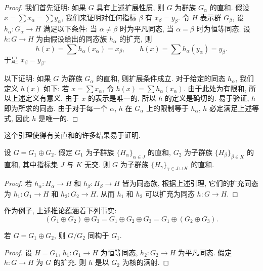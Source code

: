 \begin{proof}
我们首先证明: 如果 $G$ 具有上述扩展性质, 则 $G$ 为群族 $G_{\alpha}$ 的直和. 假设 $x=\sum x_{\alpha}=\sum y_{\alpha}$, 我们来证明对任何指标 $\beta$ 有 $x_{\beta}=y_{\beta}$. 令 $H$ 表示群 $G_{\beta}$, 设 $h_{\alpha}\colon G_{\alpha}\to H$ 满足以下条件: 当 $\alpha\neq\beta$ 时为平凡同态, 当 $\alpha=\beta$ 时为恒等同态. 设 $h\colon G\to H$ 为由假设给出的同态族 $h_{\alpha}$ 的扩充, 则
\[
h(x)=\sum h_{\alpha}(x_{\alpha})=x_{\beta},\qquad
h(x)=\sum h_{\alpha}(y_{\alpha})=y_{\beta}.
\]
于是 $x_{\beta}=y_{\beta}$.

以下证明: 如果 $G$ 为群族 $G_{\alpha}$ 的直和, 则扩展条件成立. 对于给定的同态 $h_{\alpha}$, 我们定义 $h(x)$ 如下: 若 $x=\sum x_{\alpha}$, 令 $h(x)=\sum h_{\alpha}(x_{\alpha})$. 由于此处为有限和, 所以上述定义有意义. 由于 $x$ 的表示是唯一的, 所以 $h$ 的定义是确切的. 易于验证, $h$ 即为所求的同态. 由于对于每一个 $\alpha$, $h$ 在 $G_{\alpha}$ 上的限制等于 $h_{\alpha}$, $h$ 必定满足上述等式, 因此 $h$ 是唯一的.
\end{proof}

这个引理使得有关直和的许多结果易于证明.

\begin{corollary}\label{ch11:cor-associativity}
设 $G=G_{1}\oplus G_{2}$. 假定 $G_{1}$ 为子群族 $\{H_{\alpha}\}_{\alpha\in J}$ 的直和, $G_{2}$ 为子群族 $\{H_{\beta}\}_{\beta\in K}$ 的直和, 其中指标集 $J$ 与 $K$ 无交. 则 $G$ 为子群族 $\{H_{\gamma}\}_{\gamma\in J\cup K}$ 的直和.
\end{corollary}

\begin{proof}
若 $h_{\alpha}\colon H_{\alpha}\to H$ 和 $h_{\beta}\colon H_{\beta}\to H$ 皆为同态族, 根据上述引理, 它们的扩充同态为 $h_{1}\colon G_{1}\to H$ 和 $h_{2}\colon G_{2}\to H$. 从而 $h_{1}$ 和 $h_{2}$ 可以扩充为同态 $h\colon G\to H$.
\end{proof}

作为例子, 上述推论蕴涵着下列事实:
\[
(G_{1}\oplus G_{2})\oplus G_{3}=G_{1}\oplus G_{2}\oplus G_{3}=G_{1}\oplus(G_{2}\oplus G_{3}).
\]

\begin{corollary}\label{ch11:cor-quotient}
若 $G=G_{1}\oplus G_{2}$, 则 $G/G_{2}$ 同构于 $G_{1}$.
\end{corollary}

\begin{proof}
设 $H=G_{1}$, $h_{1}\colon G_{1}\to H$ 为恒等同态, $h_{2}\colon G_{2}\to H$ 为平凡同态. 假定 $h\colon G\to H$ 为 $G$ 的扩充. 则 $h$ 是以 $G_{2}$ 为核的满射.
\end{proof}

